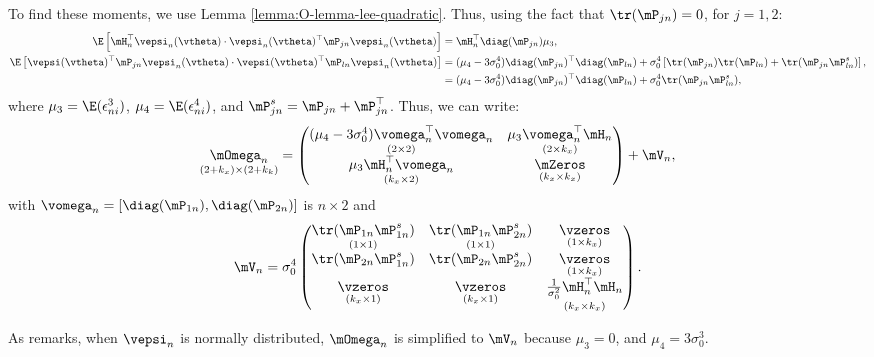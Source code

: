 \documentclass[english,12pt]{book}\usepackage[]{graphicx}\usepackage[]{xcolor}
\begin{document}
To find these moments, we use Lemma \ref{lemma:O-lemma-lee-quadratic}. Thus, using the fact that $\tr(\mP_{jn}) = 0$, for $j = 1, 2$: 
\begin{equation*}
\begin{aligned}
\E\left[\mH_n^\top\vepsi_n(\vtheta) \cdot \vepsi_n(\vtheta)^\top\mP_{jn}\vepsi_n(\vtheta)\right] & = \mH_n^\top\diag(\mP_{jn})\mu_3, \\
\E\left[\vepsi(\vtheta)^\top\mP_{jn}\vepsi_n(\vtheta) \cdot \vepsi(\vtheta)^\top\mP_{ln}\vepsi_n(\vtheta)\right]& = (\mu_4 - 3\sigma^4_0)\diag(\mP_{jn})^\top\diag(\mP_{ln}) + \sigma^4_0\left[\tr(\mP_{jn})\tr(\mP_{ln}) + \tr(\mP_{jn}\mP_{ln}^s)\right], \\
& = (\mu_4 - 3\sigma^4_0)\diag(\mP_{jn})^\top\diag(\mP_{ln}) + \sigma^4_0\tr(\mP_{jn}\mP_{ln}^s), \\
\end{aligned}
\end{equation*}
%
where $\mu_3 = \E(\epsilon_{ni}^3)$,  $\mu_4 = \E(\epsilon_{ni}^4)$, and $\mP_{jn}^s = \mP_{jn} + \mP_{jn}^\top$. Thus, we can write:
\begin{equation*}
\underset{(2 + k_x) \times (2 + k_k)}{\mOmega_n} = \begin{pmatrix}
              \underset{(2 \times 2)}{(\mu_4 - 3\sigma_0^4)\vomega_n^\top\vomega_n} & \underset{(2 \times k_x)}{\mu_3\vomega^\top_n\mH_n} \\
              \underset{(k_x \times 2)}{\mu_3 \mH_n^\top\vomega_n} & \underset{(k_x \times k_x)}{\mZeros} 
            \end{pmatrix}
             + 
             \mV_n,
\end{equation*}
%
with $\vomega_n = \left[\diag(\mP_{1n}), \diag(\mP_{2n})\right]$ is $n\times 2$ and 
\begin{equation*}
  \mV_n = \sigma_0^4
          \begin{pmatrix}
          \underset{(1\times 1)}{\tr(\mP_{1n}\mP_{1n}^s)} & \underset{(1\times 1)}{\tr(\mP_{1n}\mP_{2n}^s)} & \underset{(1\times k_x)}{\vzeros} \\
          \tr(\mP_{2n}\mP_{1n}^s) & \tr(\mP_{2n}\mP_{2n}^s) & \underset{(1\times k_x)}{\vzeros} \\
          \underset{(k_x\times 1)}{\vzeros} & \underset{(k_x\times 1)}{\vzeros} & \underset{(k_x\times k_x)}{\frac{1}{\sigma_0^2}\mH_n^\top\mH_n}
          \end{pmatrix}.
\end{equation*}

As \cite{lee2007gmm} remarks, when $\vepsi_n$ is normally distributed, $\mOmega_n$ is simplified to $\mV_n$ because $\mu_3 = 0$, and $\mu_4 = 3\sigma_0^3$.
\end{document}
